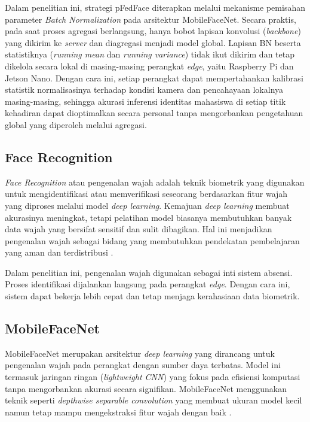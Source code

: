 Dalam penelitian ini, strategi pFedFace diterapkan melalui mekanisme pemisahan parameter \textit{Batch Normalization} pada arsitektur MobileFaceNet. Secara praktis, pada saat proses agregasi berlangsung, hanya bobot lapisan konvolusi (\textit{backbone}) yang dikirim ke \textit{server} dan diagregasi menjadi model global. Lapisan BN beserta statistiknya (\textit{running mean} dan \textit{running variance}) tidak ikut dikirim dan tetap dikelola secara lokal di masing-masing perangkat \textit{edge}, yaitu Raspberry Pi dan Jetson Nano. Dengan cara ini, setiap perangkat dapat mempertahankan kalibrasi statistik normalisasinya terhadap kondisi kamera dan pencahayaan lokalnya masing-masing, sehingga akurasi inferensi identitas mahasiswa di setiap titik kehadiran dapat dioptimalkan secara personal tanpa mengorbankan pengetahuan global yang diperoleh melalui agregasi.

\subsection{Face Recognition}
\label{subsec:face-recognition-teori}

\textit{Face Recognition} atau pengenalan wajah adalah teknik biometrik yang digunakan untuk mengidentifikasi atau memverifikasi seseorang berdasarkan fitur wajah yang diproses melalui model \textit{deep learning}. Kemajuan \textit{deep learning} membuat akurasinya meningkat, tetapi pelatihan model biasanya membutuhkan banyak data wajah yang bersifat sensitif dan sulit dibagikan. Hal ini menjadikan pengenalan wajah sebagai bidang yang membutuhkan pendekatan pembelajaran yang aman dan terdistribusi \parencite{Kim2021}.

Dalam penelitian ini, pengenalan wajah digunakan sebagai inti sistem absensi. Proses identifikasi dijalankan langsung pada perangkat \textit{edge}. Dengan cara ini, sistem dapat bekerja lebih cepat dan tetap menjaga kerahasiaan data biometrik.

\subsection{MobileFaceNet}
\label{subsec:mobilefacenet-teori}

MobileFaceNet merupakan arsitektur \textit{deep learning} yang dirancang untuk pengenalan wajah pada perangkat dengan sumber daya terbatas. Model ini termasuk jaringan ringan (\textit{lightweight CNN}) yang fokus pada efisiensi komputasi tanpa mengorbankan akurasi secara signifikan. MobileFaceNet menggunakan teknik seperti \textit{depthwise separable convolution} yang membuat ukuran model kecil namun tetap mampu mengekstraksi fitur wajah dengan baik \parencite{Xiao2024}.

